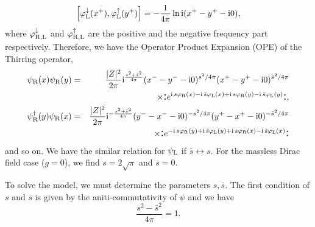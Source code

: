 \documentclass[a4paper,fleqn]{article}
\begin{document}
\begin{equation}
\left[\varphi_{\rm L}^\downarrow (x^{+}), 
        \varphi_{\rm L}^\uparrow (y^{+})\right] 
= - \frac{1}{4 \pi} \ln  {\rm i}(x^+- y^+-{\rm i} 0),
\end{equation}
where $\varphi_{\rm R, L}^\downarrow$ and $\varphi_{\rm R, L}^\uparrow$ are
the positive and the negative frequency part respectively. 
Therefore, we have the Operator Product Expansion (OPE) of the Thirring operator, 
\begin{eqnarray}
\psi_{\rm R}(x) \psi_{\rm R}(y) &=& \frac{|Z|^2}{2 \pi}
                    {\rm i}^{\frac{s^2+\bar{s}^2}{4 \pi}}
                    (x^- - y^- - {\rm i} 0)^{s^2/4\pi}
                    (x^+ - y^+ - {\rm i} 0)^{\bar{s}^2/4\pi} \nonumber\\
& & \quad \quad \times \mbox{\Large :} 
  e^{{\rm i}\, s \varphi_{\rm R}(x) - {\rm i}\,\bar{s} \varphi_{\rm L}(x)
                + {\rm i}\, s \varphi_{\rm R}(y) - {\rm i}\,\bar{s} \varphi_{\rm L}(y)}
 \mbox{\Large :}, \\
\psi_{\rm R}^\dagger(y) \psi_{\rm R}(x) &=& \frac{|Z|^2}{2 \pi}
                    {\rm i}^{-\frac{s^2+\bar{s}^2}{4 \pi}}
                    (y^- - x^- - {\rm i} 0)^{-s^2/4\pi}
                    (y^+ - x^+ - {\rm i} 0)^{-\bar{s}^2/4\pi} \nonumber\\
& & \quad \quad \times \mbox{\Large :} 
  e^{ -{\rm i}\, s \varphi_{\rm R}(y) + {\rm i}\,\bar{s} \varphi_{\rm L}(y)
                + {\rm i}\, s \varphi_{\rm R}(x) - {\rm i}\,\bar{s} \varphi_{\rm L}(x)}
 \mbox{\Large :} 
\end{eqnarray}
and so on. We have the similar relation for $\psi_{\rm L}$ if $\bar s \leftrightarrow s$.
For the massless Dirac field case ($g=0$), we find $s=2 \sqrt{\pi}$ and $\bar{s}=0$.

To solve the model, we must determine the parameters $s, \bar{s}$.
The first condition of $s$ and $\bar{s}$ is given by the aniti-commutativity of
$\psi$ and we have
\begin{equation}
\frac{s^2 - \bar{s}^2}{4 \pi} = 1.
\end{equation}

\end{document}
